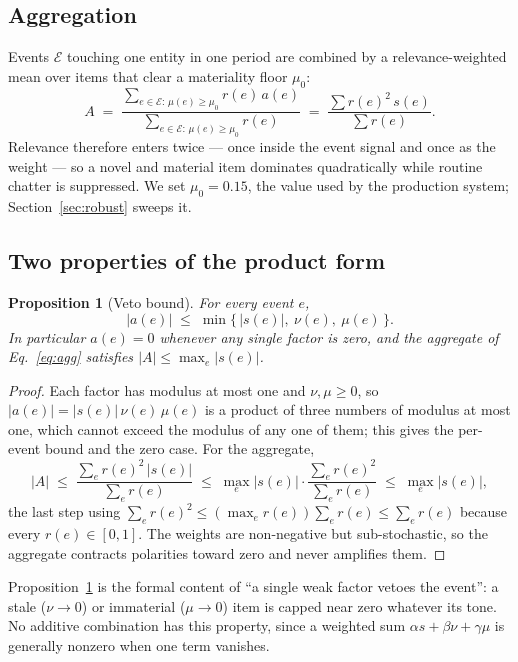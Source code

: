 \documentclass[preprint,12pt,authoryear]{elsarticle}
\theoremstyle{plain}
\newtheorem{proposition}{Proposition}
\theoremstyle{remark}
\begin{document}
\subsection{Aggregation}

Events $\mathcal{E}$ touching one entity in one period are combined by a
relevance-weighted mean over items that clear a materiality floor $\mu_0$:
\begin{equation}\label{eq:agg}
A\;=\;\frac{\sum_{e\in\mathcal{E}:\,\mu(e)\ge\mu_0} r(e)\,a(e)}
           {\sum_{e\in\mathcal{E}:\,\mu(e)\ge\mu_0} r(e)}
 \;=\;\frac{\sum r(e)^2\,s(e)}{\sum r(e)}.
\end{equation}
Relevance therefore enters twice --- once inside the event signal and once as
the weight --- so a novel and material item dominates quadratically while
routine chatter is suppressed. We set $\mu_0=0.15$, the value used by the
production system; Section~\ref{sec:robust} sweeps it.

\subsection{Two properties of the product form}

\begin{proposition}[Veto bound]\label{prop:veto}
For every event $e$,
\[
|a(e)|\;\le\;\min\{\,|s(e)|,\ \nu(e),\ \mu(e)\,\}.
\]
In particular $a(e)=0$ whenever any single factor is zero, and the aggregate of
Eq.~\eqref{eq:agg} satisfies $|A|\le\max_{e}|s(e)|$.
\end{proposition}

\begin{proof}
Each factor has modulus at most one and $\nu,\mu\ge0$, so
$|a(e)|=|s(e)|\,\nu(e)\,\mu(e)$ is a product of three numbers of modulus at most
one, which cannot exceed the modulus of any one of them; this gives the
per-event bound and the zero case. For the aggregate,
\[
|A|\;\le\;\frac{\sum_e r(e)^2\,|s(e)|}{\sum_e r(e)}
   \;\le\;\max_e|s(e)|\cdot\frac{\sum_e r(e)^2}{\sum_e r(e)}
   \;\le\;\max_e|s(e)|,
\]
the last step using $\sum_e r(e)^2\le(\max_e r(e))\sum_e r(e)\le\sum_e r(e)$
because every $r(e)\in[0,1]$. The weights are non-negative but sub-stochastic,
so the aggregate contracts polarities toward zero and never amplifies them.
\end{proof}

Proposition~\ref{prop:veto} is the formal content of ``a single weak factor
vetoes the event'': a stale ($\nu\!\to\!0$) or immaterial ($\mu\!\to\!0$) item is
capped near zero whatever its tone. No additive combination has this property,
since a weighted sum $\alpha s+\beta\nu+\gamma\mu$ is generally nonzero when one
term vanishes.
\end{document}
